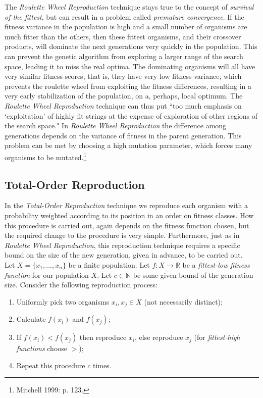 \documentclass[a4paper]{article}
\theoremstyle{dotless}
\begin{document}
The \emph{Roulette Wheel Reproduction} technique stays true to the concept of \emph{survival of the fittest}, but can result in a problem called \emph{premature convergence}.  If the fitness variance in the population is high and a small number of organisms are much fitter than the others, then these fittest organisms, and their crossover products, will dominate the next generations very quickly in the population. This can prevent the genetic algorithm from exploring a larger range of the search space, leading it to miss the real optima. The dominating organisms will all have very similar fitness scores, that is, they have very low fitness variance, which prevents the roulette wheel from exploiting the fitness differences, resulting in a very early stabilization of the population, on a, perhaps, local optimum. The \emph{Roulette Wheel Reproduction} technique can thus put ``too much emphasis on `exploitation' of highly fit strings at the expense of exploration of other regions of the search space." In \emph{Roulette Wheel Reproduction} the difference among generations depends on the variance of fitness in the parent generation. This problem can be met by choosing a high mutation parameter, which forces many organisms to be mutated.\footnote{Mitchell 1999: p. 123.}

\subsection{Total-Order Reproduction}

In the \textit{Total-Order Reproduction} technique we reproduce each organism with a probability weighted according to its position in an order on fitness classes. How this procedure is carried out, again depends on the fitness function chosen, but the required change to the procedure is very simple. Furthermore, just as in \emph{Roulette Wheel Reproduction}, this reproduction technique requires a specific bound on the size of the new generation, given in advance, to be carried out.\\

Let $X = \{x_1,...,x_n \}$ be a finite population. Let $f: X \rightarrow \mathbb{R}$ be a \emph{fittest-low fitness function} for our population $X$. Let $c \in \mathbb{N}$ be some given bound of the generation size. Consider the following reproduction process:

	\begin{enumerate}
	\item Uniformly pick two organisms $x_i,x_j \in X$ (not necessarily distinct);
	\item Calculate $f(x_i)$ and $f(x_j)$;
	\item If $f(x_i) < f(x_j)$ then reproduce $x_i$, else reproduce $x_j$ (for \emph{fittest-high functions} choose $>$);
	\item Repeat this procedure $c$ times.
	\end{enumerate}
	
\end{document}
